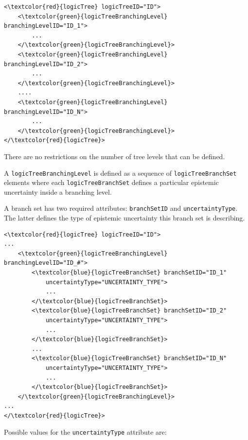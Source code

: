 \begin{Verbatim}[frame=single, commandchars=\\\{\}]
<\textcolor{red}{logicTree} logicTreeID="ID">
	<\textcolor{green}{logicTreeBranchingLevel} branchingLevelID="ID_1">
		...
	</\textcolor{green}{logicTreeBranchingLevel}>
	<\textcolor{green}{logicTreeBranchingLevel} branchingLevelID="ID_2">
		...
	</\textcolor{green}{logicTreeBranchingLevel}>
	....
	<\textcolor{green}{logicTreeBranchingLevel} branchingLevelID="ID_N">
		...
	</\textcolor{green}{logicTreeBranchingLevel}>
</\textcolor{red}{logicTree}>
\end{Verbatim}

There are no restrictions on the number of tree levels that can be defined.

A \Verb+logicTreeBranchingLevel+ is defined as a sequence of
\Verb+logicTreeBranchSet+ elements where each \Verb+logicTreeBranchSet+
defines a particular epistemic uncertainty inside a branching level.

A branch set has two required attributes: \Verb+branchSetID+ and
\Verb+uncertaintyType+. The latter defines the type of epistemic uncertainty
this branch set is describing.

\begin{Verbatim}[frame=single, commandchars=\\\{\}]
<\textcolor{red}{logicTree} logicTreeID="ID">
...
	<\textcolor{green}{logicTreeBranchingLevel} branchingLevelID="ID_#">
		<\textcolor{blue}{logicTreeBranchSet} branchSetID="ID_1"
			uncertaintyType="UNCERTAINTY_TYPE">
			...
		</\textcolor{blue}{logicTreeBranchSet}>
		<\textcolor{blue}{logicTreeBranchSet} branchSetID="ID_2"
			uncertaintyType="UNCERTAINTY_TYPE">
			...
		</\textcolor{blue}{logicTreeBranchSet}>
		...
		<\textcolor{blue}{logicTreeBranchSet} branchSetID="ID_N"
			uncertaintyType="UNCERTAINTY_TYPE">
			...
		</\textcolor{blue}{logicTreeBranchSet}>
	</\textcolor{green}{logicTreeBranchingLevel}>
...
</\textcolor{red}{logicTree}>
\end{Verbatim}

Possible values for the \Verb+uncertaintyType+ attribute are:

